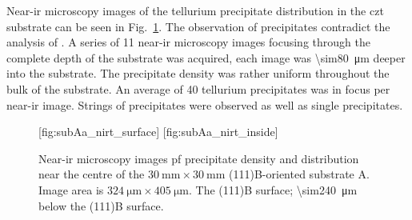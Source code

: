 Near-\ac{ir} microscopy images of the tellurium precipitate distribution in the \ac{czt} substrate can be seen in Fig.~\ref{fig:subAa_nirt}. The observation of  precipitates contradict the analysis of \citeauthor{yujie2004infrared}. A series of 11 near-\ac{ir} microscopy images focusing through the complete depth of the substrate was acquired, each image was \SI{\sim80}{\micro\metre} deeper into the substrate. The  precipitate density was rather uniform throughout the bulk of the substrate. An average of 40 tellurium precipitates was in focus per near-\ac{ir} image. Strings of  precipitates were observed as well as single  precipitates.

\begin{figure}[htbp]
    \centering
    [fig:subAa_nirt_surface]
    \hfill
    [fig:subAa_nirt_inside]
    \caption[Near-\ac{ir} microscopy images of  precipitates in substrate A.]{Near-\ac{ir} microscopy images pf  precipitate density and distribution near the centre of the $\SI{30}{\milli\metre}\times\SI{30}{\milli\metre}$ (111)B-oriented substrate A. Image area is $\SI{324}{\micro\metre}\times\SI{405}{\micro\metre}$.  The (111)B surface;  \SI{\sim240}{\micro\metre} below the (111)B surface.}\label{fig:subAa_nirt}
\end{figure}



\begin{comment}
Mange artikler i denne katalogen: G:\Brukere\ESg\papers\CMT\CdZnTe

se spesielt på 
-	figurer i »CZT inclusions Belas 2008»
-	CZT substrates Japan Energy (de som lager våre subs)
-	Fig 1 i Defects in CZT. Hossain-2015

\end{comment}

